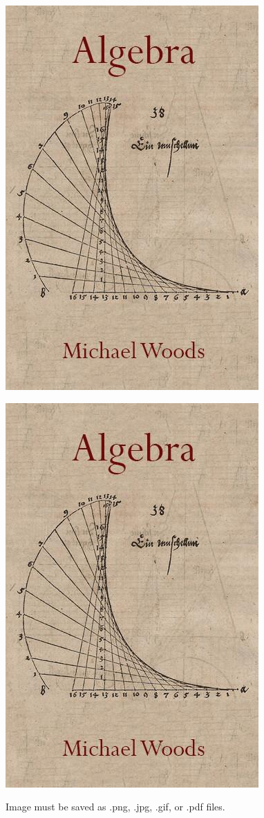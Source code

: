 \documentclass[11pt]{article}
\begin{document}
\begin{center}
\includegraphics[scale=0.3]{algebra.jpg}

\includegraphics[angle=45, scale=0.3]{algebra.jpg}

Image must be saved as .png, .jpg, .gif, or .pdf files.
\end{center}
\end{document}
